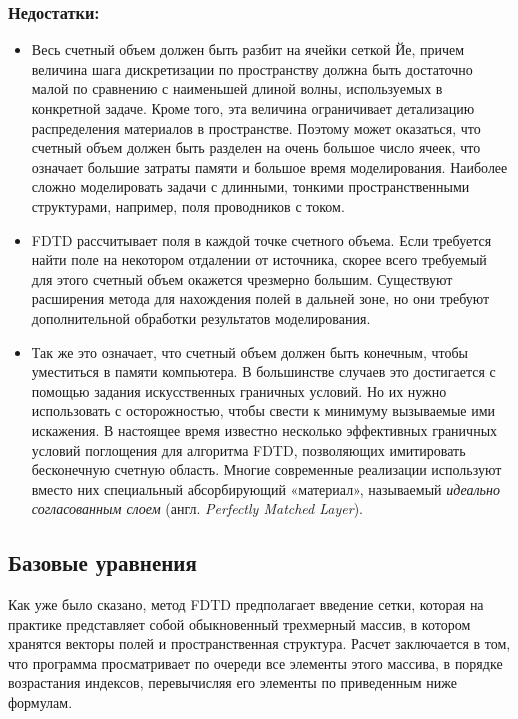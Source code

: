 \subsubsection*{Недостатки:}
\begin{itemize}

\item
Весь счетный объем должен быть разбит на ячейки сеткой Йе, причем величина шага
дискретизации по пространству должна быть достаточно малой по сравнению
с наименьшей длиной волны, используемых в конкретной задаче. Кроме того, эта
величина ограничивает детализацию распределения материалов в пространстве.
Поэтому может оказаться, что счетный объем должен быть разделен на очень большое
число ячеек, что означает большие затраты памяти и большое время моделирования.
Наиболее сложно моделировать задачи с длинными, тонкими пространственными
структурами, например, поля проводников с током.

\item
FDTD рассчитывает поля в каждой точке счетного объема. Если требуется найти поле
на некотором отдалении от источника, скорее всего требуемый для этого счетный
объем окажется чрезмерно большим. Существуют расширения метода для нахождения
полей в дальней зоне, но они требуют дополнительной обработки результатов
моделирования.

\item
Так же это означает, что счетный объем должен быть конечным, чтобы уместиться
в памяти компьютера. В большинстве случаев это достигается с помощью задания
искусственных граничных условий. Но их нужно использовать с осторожностью,
чтобы свести к минимуму вызываемые ими искажения. В настоящее время известно
несколько эффективных граничных условий поглощения для алгоритма FDTD,
позволяющих имитировать бесконечную счетную область. Многие современные
реализации используют вместо них специальный абсорбирующий «материал»,
называемый \emph{идеально согласованным слоем} (англ. \emph{Perfectly Matched
Layer}).
\end{itemize}


\subsection{Базовые уравнения}

Как уже было сказано, метод FDTD предполагает введение сетки, которая на
практике представляет собой обыкновенный трехмерный массив, в котором хранятся
векторы полей и пространственная структура. Расчет заключается в том, что
программа просматривает по очереди все элементы этого массива, в порядке
возрастания индексов, перевычисляя его элементы по приведенным ниже формулам.

